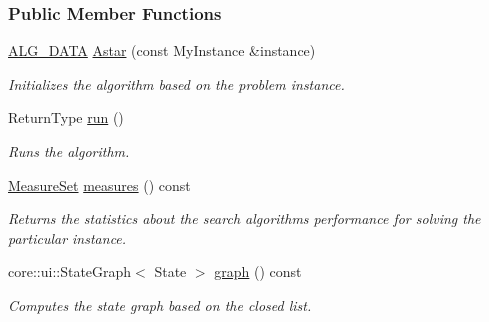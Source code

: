 \subsubsection*{Public Member Functions}
\begin{DoxyCompactItemize}
\item 
\hyperlink{algorithm_8h_a64c012078deee9a30405e18ec11e6360}{A\+L\+G\+\_\+\+D\+A\+TA} \hyperlink{structalgorithm_1_1Astar_af1c70d48696e6c0ebf321fb7a7528d61}{Astar} (const My\+Instance \&instance)
\begin{DoxyCompactList}\small\item\em Initializes the algorithm based on the problem instance. \end{DoxyCompactList}\item 
Return\+Type \hyperlink{structalgorithm_1_1Astar_ade41c917ceb77094416b1fbcefe7c835}{run} ()
\begin{DoxyCompactList}\small\item\em Runs the algorithm. \end{DoxyCompactList}\item 
\hyperlink{structMeasureSet}{Measure\+Set} \hyperlink{structalgorithm_1_1Astar_a464d946958d871d56742c51c70c44ec6}{measures} () const 
\begin{DoxyCompactList}\small\item\em Returns the statistics about the search algorithm\textquotesingle{}s performance for solving the particular instance. \end{DoxyCompactList}\item 
core\+::ui\+::\+State\+Graph$<$ State $>$ \hyperlink{structalgorithm_1_1Astar_ad9167187eb42e9805bc789fbeec870e6}{graph} () const 
\begin{DoxyCompactList}\small\item\em Computes the state graph based on the closed list. \end{DoxyCompactList}\end{DoxyCompactItemize}

